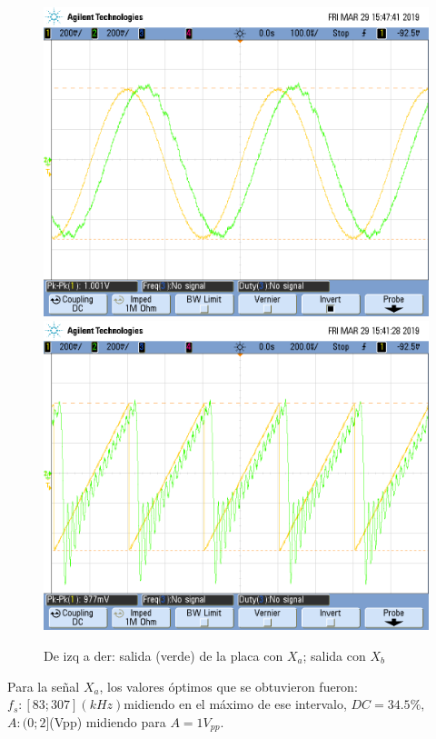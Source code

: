 \documentclass[../../ASSD_TP1_G7.tex]{subfiles}
\begin{document}
\begin{figure}[H]

\centering{}\includegraphics[scale=0.25]{Imagenes/syh_pto_asin3}\includegraphics[scale=0.25]{Imagenes/syh_pto_adiente}\caption{De izq a der: salida (verde) de la placa con $X_{a}$; salida con
$X_{b}$}
\end{figure}

Para la señal $X_{a}$, los valores óptimos que se obtuvieron fueron:
$f_{s}:[83;307](kHz)$midiendo en el máximo de ese intervalo, $DC=34.5\%,$$A:(0;2]$(Vpp)
midiendo para $A=1V_{pp}$.
\end{document}

